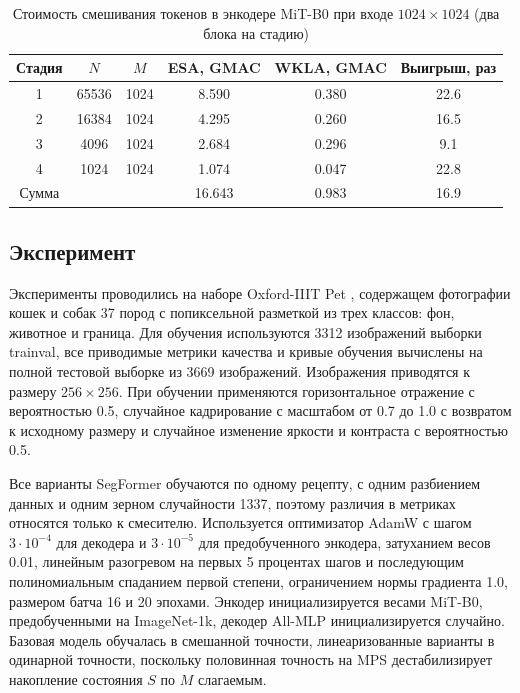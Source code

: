 \documentclass[a4paper,14pt]{article}
\numberwithin{figure}{section}
\numberwithin{table}{section}
\newcommand{\best}[1]{\cellcolor{green!25}#1}
\newcommand{\worst}[1]{\cellcolor{red!25}#1}
\begin{document}
	\begin{table}[H]
		\centering
		\caption{Стоимость смешивания токенов в энкодере MiT-B0 при входе $1024 \times 1024$ (два блока на стадию)}
		\label{tab:complexity}
		\begin{tabular}{cccccc}
			\toprule
			Стадия & $N$ & $M$ & ESA, GMAC & WKLA, GMAC & Выигрыш, раз \\
			\midrule
			1 & 65536 & 1024 & \worst{8.590} & \best{0.380} & 22.6 \\
			2 & 16384 & 1024 & \worst{4.295} & \best{0.260} & 16.5 \\
			3 & 4096 & 1024 & \worst{2.684} & \best{0.296} & 9.1 \\
			4 & 1024 & 1024 & \worst{1.074} & \best{0.047} & 22.8 \\
			\midrule
			Сумма & & & \worst{16.643} & \best{0.983} & 16.9 \\
			\bottomrule
		\end{tabular}
	\end{table}


\subsection{Эксперимент}

	Эксперименты проводились на наборе Oxford-IIIT Pet \cite{pets}, содержащем фотографии кошек и собак 37 пород с попиксельной разметкой из трех классов:
	фон, животное и граница. Для обучения используются 3312 изображений выборки trainval, все приводимые метрики качества и кривые обучения вычислены
	на полной тестовой выборке из 3669 изображений. Изображения приводятся к размеру
	$256 \times 256$. При обучении применяются горизонтальное отражение с вероятностью 0.5, случайное кадрирование с масштабом от 0.7 до 1.0 с возвратом к исходному
	размеру и случайное изменение яркости и контраста с вероятностью 0.5.

	Все варианты SegFormer обучаются по одному рецепту, с одним разбиением данных и одним зерном случайности 1337, поэтому различия в метриках относятся
	только к смесителю. Используется оптимизатор AdamW \cite{adamw} с шагом $3 \cdot 10^{-4}$ для декодера и $3 \cdot 10^{-5}$ для предобученного энкодера,
	затуханием весов 0.01, линейным разогревом на первых 5 процентах шагов и последующим полиномиальным спаданием первой степени, ограничением нормы градиента
	1.0, размером батча 16 и 20 эпохами. Энкодер инициализируется весами MiT-B0, предобученными на ImageNet-1k, декодер All-MLP инициализируется случайно.
	Базовая модель обучалась в смешанной точности, линеаризованные варианты в одинарной точности, поскольку половинная точность на MPS дестабилизирует
	накопление состояния $S$ по $M$ слагаемым.
\end{document}
